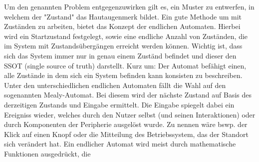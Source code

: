 Um den genannten Problem entgegenzuwirken gilt es, ein Muster zu entwerfen,
in welchem der "Zustand" das Hautaugenmerk bildet.
Ein gute Methode um mit Zuständen zu arbeiten, bietet das Konzept der endlichen Automaten.
Hierbei wird ein Startzustand festgelegt, sowie eine endliche Anzahl von Zuständen, die im System mit
Zustandsübergängen erreicht werden können. Wichtig ist, dass sich das System immer nur in genau
einem Zuständ befindet und dieser den SSOT (single source of truth) darstellt.
Kurz um: Der Automat befähigt einen, alle Zustände in dem sich ein System befinden kann
konsisten zu beschreiben. 
Unter den unterschiedlichen endlichen Automaten fällt die Wahl auf den sogenannten Mealy-Automat.
Bei diesem wird der nächste Zustand auf Basis des derzeitigen Zustands und Eingabe ermittelt.
Die Eingabe spiegelt dabei ein Ereigniss wieder, welches durch den Nutzer selbst (und seinen Interaktionen) 
oder durch Komponenten der Peripherie ausgelöst wurde. Zu nennen wäre bswp. 
der Klick auf einen Knopf oder die Mitteilung des Betriebssystem, das der Standort sich verändert hat.
Ein endlicher Automat wird meist durch mathematische Funktionen ausgedrückt, die 